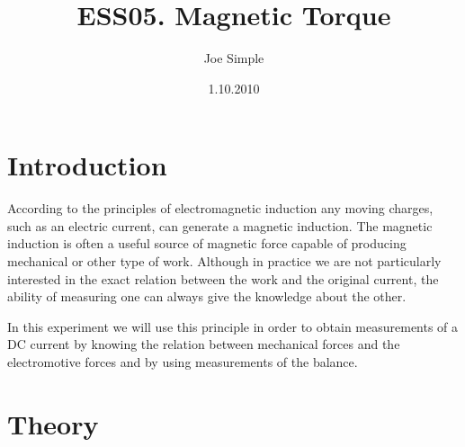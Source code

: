 \documentclass[twocolumn]{article}
\begin{document}
\title{ESS05. Magnetic Torque} %
\author{Joe Simple}%
\date{1.10.2010} %


\section{Introduction}
\label{sec:introduction}

According to the principles of electromagnetic induction any moving charges, such as an electric current, can generate a magnetic induction. The magnetic induction is often a useful source of magnetic force capable of producing mechanical or other type of work. Although in practice we are not particularly interested in the exact relation between the work and the original current, the ability of measuring one can always give the knowledge about the other. 

\vspace{2 mm}
\noindent
In this experiment we will use this principle in order to obtain measurements of a DC current by knowing the relation between mechanical forces and the electromotive forces and by using measurements of the balance.

\section{Theory}
\label{sec:theory}
\end{document}
